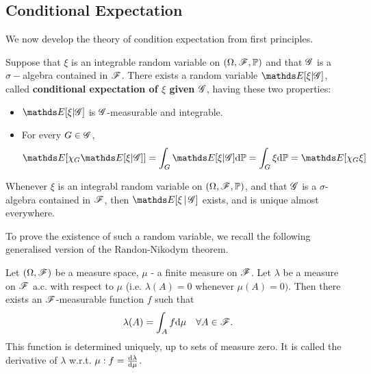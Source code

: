 \subsection{Conditional Expectation}
We now develop the theory of condition expectation from first principles. 

\begin{definition} \label{def:conditional_expectation}
Suppose that $\xi$ is an integrable random variable on $(\Omega, \mathcal{F}, \mathbb{P})$ and that $\mathcal{G}$ is a $\sigma-$algebra contained in $\mathcal{F}$. There exists a random variable $\E[\xi | \G]$, called \textbf{conditional expectation of $\xi$ given $\mathcal{G}$}, having these two properties:
\begin{itemize}
    \item $\E[\xi | \G]$ is $\mathcal{G}$-measurable and integrable.
    \item For every $G \in \mathcal{G}$,
    \begin{equation} \label{eq:condtional_expectation}
        \E[\chi_G \E[\xi | \G]] = \int_G \E[\xi | \G] \d \p = \int_G \xi \d \p = \E[\chi_G \xi]
    \end{equation}
\end{itemize}
\end{definition}

\begin{theorem} Whenever $\xi$ is an integrabl random variable on $(\Omega, \mathcal{F}, \mathbb{P})$, and that $\mathcal{G}$ is a $\sigma$-algebra contained in $\mathcal{F}$, then $\E[\xi \,|\, \G]$ exists, and is unique almost everywhere.
\end{theorem}

To prove the existence of such a random variable, we recall the following generalised version of the Randon-Nikodym theorem.

\begin{theorem}
Let $(\Omega, \mathcal{F})$ be a measure space, $\mu$ - a finite measure on $\mathcal{F}$. Let $\lambda$ be a measure on $\mathcal{F}$ a.c. with respect to $\mu$ (i.e. $\lambda (A) = 0$ whenever $\mu(A)=0)$. Then there exists an $\mathcal{F}$-measurable function $f$ such that 
\begin{equation}
    \lambda(A) = \int_A f \mathrm{d} \mu \quad \forall A \in \mathcal{F}.
\end{equation}
This function is determined uniquely, up to sets of measure zero. It is called the derivative of $\lambda$ w.r.t. $\mu: f = \frac{\mathrm{d} \lambda}{\mathrm{d} \mu}$. 
\end{theorem}

